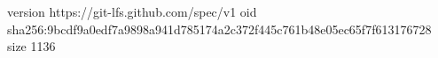 version https://git-lfs.github.com/spec/v1
oid sha256:9bcdf9a0edf7a9898a941d785174a2c372f445c761b48e05ec65f7f613176728
size 1136
